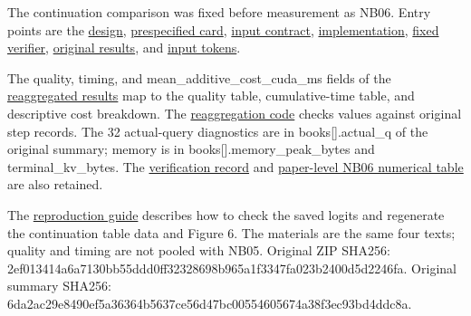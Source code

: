 \documentclass[10pt,a4paper]{article}
\begin{document}
The continuation comparison was fixed before measurement as NB06. Entry points are the \href{https://github.com/metaSATOKEN/nsn/blob/c37d39ea0106274d9f661cfbb268b0ed05319846/plans/loop-kv-nb06-design-v0.1-2026-10-08.md}{design}, \href{https://github.com/metaSATOKEN/nsn/blob/c37d39ea0106274d9f661cfbb268b0ed05319846/plans/prespecified/loop-kv-nb06-v0.1-2026-10-08.md}{prespecified card}, \href{https://github.com/metaSATOKEN/nsn/blob/c37d39ea0106274d9f661cfbb268b0ed05319846/plans/loop-kv-nb06-input-contract-v0.1-2026-10-08.json}{input contract}, \href{https://github.com/metaSATOKEN/nsn/blob/c37d39ea0106274d9f661cfbb268b0ed05319846/scripts/loop_kv_nb06.py}{implementation}, \href{https://github.com/metaSATOKEN/nsn/blob/c37d39ea0106274d9f661cfbb268b0ed05319846/scripts/verify_loop_kv_nb06.py}{fixed verifier}, \href{https://github.com/metaSATOKEN/nsn/blob/c37d39ea0106274d9f661cfbb268b0ed05319846/runs/loop-kv-nb06-20261008-075410-5621380a/summary.json}{original results}, and \href{https://github.com/metaSATOKEN/nsn/blob/c37d39ea0106274d9f661cfbb268b0ed05319846/runs/loop-kv-nb06-20261008-075410-5621380a/materials.json}{input tokens}.

The quality, timing, and mean\_additive\_cost\_cuda\_ms fields of the \href{https://github.com/metaSATOKEN/nsn/blob/c37d39ea0106274d9f661cfbb268b0ed05319846/reports/nb06-results-v0.1-2026-10-08.json}{reaggregated results} map to the quality table, cumulative-time table, and descriptive cost breakdown. The \href{https://github.com/metaSATOKEN/nsn/blob/c37d39ea0106274d9f661cfbb268b0ed05319846/scripts/analyze_loop_kv_nb06_results.py}{reaggregation code} checks values against original step records. The 32 actual-query diagnostics are in books{[}{]}.actual\_q of the original summary; memory is in books{[}{]}.memory\_peak\_bytes and terminal\_kv\_bytes. The \href{https://github.com/metaSATOKEN/nsn/blob/c37d39ea0106274d9f661cfbb268b0ed05319846/data/validation/nb06/verification-summary.json}{verification record} and \href{https://github.com/metaSATOKEN/nsn/blob/c37d39ea0106274d9f661cfbb268b0ed05319846/papers/loop-kv/data/numerical-audit-nb06-v0.1-2026-10-08.json}{paper-level NB06 numerical table} are also retained.

The \href{https://github.com/metaSATOKEN/nsn/blob/c37d39ea0106274d9f661cfbb268b0ed05319846/REPRODUCIBILITY.md}{reproduction guide} describes how to check the saved logits and regenerate the continuation table data and Figure 6. The materials are the same four texts; quality and timing are not pooled with NB05. Original ZIP SHA256: 2ef013414a6a7130bb55ddd0ff32328698b965a1f3347fa023b2400d5d2246fa. Original summary SHA256: 6da2ac29e8490ef5a36364b5637ce56d47bc00554605674a38f3ec93bd4ddc8a.
\end{document}
